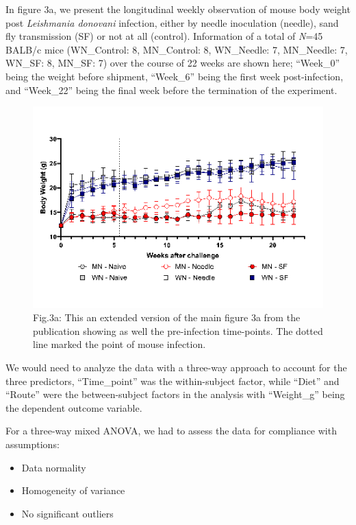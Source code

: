 \documentclass[
  12pt,
  letterpaper,
]{article}
\providecommand{\tightlist}{%
  \setlength{\itemsep}{0pt}\setlength{\parskip}{0pt}}
\begin{document}
In figure 3a, we present the longitudinal weekly observation of mouse body weight post \emph{Leishmania donovani} infection, either by needle inoculation (needle), sand fly transmission (SF) or not at all (control). Information of a total of \emph{N}=45 BALB/c mice (WN\_Control: 8, MN\_Control: 8, WN\_Needle: 7, MN\_Needle: 7, WN\_SF: 8, MN\_SF: 7) over the course of 22 weeks are shown here; ``Week\_0'' being the weight before shipment, ``Week\_6'' being the first week post-infection, and ``Week\_22'' being the final week before the termination of the experiment.

\begin{figure}[H]

{\centering \includegraphics[width=0.9\linewidth,]{Statistics_report_files/figure-latex/call-for-figure-3a-extended-1} 

}

\caption{Fig.3a: This an extended version of the main figure 3a from the publication showing as well the pre-infection time-points. The dotted line marked the point of mouse infection.}\label{fig:call-for-figure-3a-extended}
\end{figure}

We would need to analyze the data with a three-way approach to account for the three predictors, ``Time\_point'' was the within-subject factor, while ``Diet'' and ``Route'' were the between-subject factors in the analysis with ``Weight\_g'' being the dependent outcome variable.

For a three-way mixed ANOVA, we had to assess the data for compliance with assumptions:

\begin{itemize}
\tightlist
\item
  Data normality
\item
  Homogeneity of variance
\item
  No significant outliers
\end{itemize}
\end{document}
